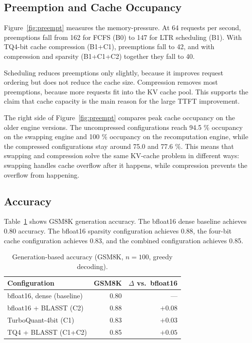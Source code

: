 \documentclass[conference]{IEEEtran}
\begin{document}
\subsection{Preemption and Cache Occupancy}

Figure~\ref{fig:preempt} measures the memory-pressure. At 64 requests per second, preemptions fall from 162 for FCFS (B0) to 147 for LTR scheduling (B1). With TQ4-bit cache compression (B1+C1), preemptions fall to 42, and with compression and sparsity (B1+C1+C2) together they fall to 40.

Scheduling reduces preemptions only slightly, because it improves request ordering but does not reduce the cache size. Compression removes most preemptions, because more requests fit into the KV cache pool. This supports the claim that cache capacity is the main reason for the large TTFT improvement.

The right side of Figure~\ref{fig:preempt} compares peak cache occupancy on the older engine versions. The uncompressed configurations reach 94.5 \% occupancy on the swapping engine and 100 \% occupancy on the recomputation engine, while the compressed configurations stay around 75.0 and 77.6 \%. This means that swapping and compression solve the same KV-cache problem in different ways: swapping handles cache overflow after it happens, while compression prevents the overflow from happening.

\subsection{Accuracy}

Table~\ref{tab:accuracy} shows GSM8K generation accuracy. The bfloat16 dense baseline achieves 0.80 accuracy. The bfloat16 sparsity configuration achieves 0.88, the four-bit cache configuration achieves 0.83, and the combined configuration achieves 0.85.

\begin{table}[H]
  \caption{Generation-based accuracy (GSM8K, $n=100$, greedy decoding).}
  \label{tab:accuracy}
  \centering
  \small
  \begin{tabular}{@{}lrr@{}}
    \toprule
    Configuration & GSM8K & $\Delta$ vs.\ bfloat16 \\
    \midrule
    bfloat16, dense (baseline) & 0.80 & --- \\
    bfloat16 + BLASST (C2)     & 0.88 & $+0.08$ \\
    TurboQuant-4bit (C1)       & 0.83 & $+0.03$ \\
    TQ4 + BLASST (C1+C2)       & 0.85 & $+0.05$ \\
    \bottomrule
  \end{tabular}
\end{table}
\end{document}
